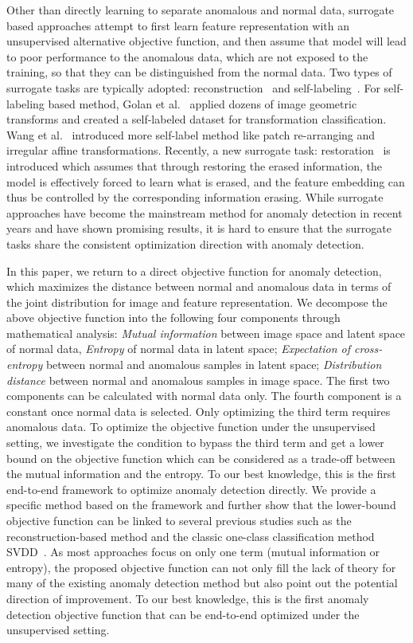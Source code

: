 \documentclass[journal]{IEEEtran}
\theoremstyle{remark}
\begin{document}
Other than directly learning to separate anomalous and normal data, surrogate based approaches attempt to first learn feature representation with an unsupervised alternative objective function, and then assume that model will lead to poor performance to the anomalous data, which are not exposed to the training, so that they can be distinguished from the normal data. Two types of surrogate tasks are typically adopted: reconstruction~\cite{Sabokrou2018Adversarially,deecke2018anomaly,Akcay2018,OCGAN} and self-labeling~\cite{golan2018deep,NipsEffective}. For self-labeling based method, 
Golan et al.~\cite{golan2018deep} applied dozens of image geometric transforms and created a self-labeled dataset for transformation classification. Wang et al.~\cite{NipsEffective} introduced more self-label method like patch re-arranging and irregular affine transformations.
Recently, a new surrogate task: restoration~\cite{fye2020ARNet} is introduced which assumes that through restoring the erased information, the model is effectively forced to learn what is erased, and the feature embedding can thus be controlled by the corresponding information erasing. 
While surrogate approaches have become the mainstream method for anomaly detection in recent years and have shown promising results, it is hard to ensure that the surrogate tasks share the consistent optimization direction with anomaly detection. 

In this paper, we return to a direct objective function for anomaly detection, which maximizes the distance between normal and anomalous data in terms of the joint distribution for image and feature representation.
We decompose the above objective function into the following four components through mathematical analysis: \emph{Mutual information} between image space and latent space of normal data, \emph{Entropy} of normal data in latent space; \emph{Expectation of cross-entropy} between normal and anomalous samples in latent space; \emph{Distribution distance} between normal and anomalous samples in image space.
The first two components can be calculated with normal data only. The fourth component is a constant once normal data is selected.
Only optimizing the third term requires anomalous data. To optimize the objective function under the unsupervised setting, we investigate the condition to bypass the third term and get a lower bound on the objective function which can be considered as a trade-off between the mutual information and the entropy. To our best knowledge, this is the first end-to-end framework to optimize anomaly detection directly. We  provide a specific method based on the framework and further show that the lower-bound objective function can be linked to several previous studies such as the reconstruction-based method and the classic one-class classification method SVDD~\cite{SVDD}. 
As most approaches focus on only one term (mutual information or entropy), the proposed objective function can not only fill the lack of theory for many of the existing anomaly detection method but also point out the potential direction of improvement. To our best knowledge, this is the first anomaly detection objective function that can be end-to-end optimized under the unsupervised setting.
\end{document}
